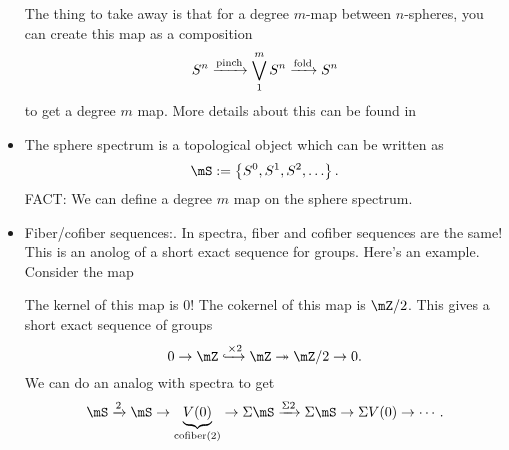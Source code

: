 \begin{itemize}
\begin{center}
    \end{center}
    The thing to take away is that for a degree $m$-map between $n$-spheres, you can create this map as a composition $$S^n\xrightarrow{\text{pinch}}\bigvee_1^m S^n\xrightarrow{\text{fold}}S^n$$ to get a degree $m$ map. More details about this can be found in \cite[\S 2.2]{Hatcher}
    \item The {sphere spectrum} is a topological object which can be written as $$\mS:=\sets{S^0,S^1,S^2,\dots}.$$ FACT: We can define a degree $m$ map on the sphere spectrum. 
    \item Fiber/cofiber sequences:. In spectra, fiber and cofiber sequences are the same! This is an anolog of a short exact sequence for groups. Here's an example. Consider the map 
    \begin{center}
    \end{center}
    The kernel of this map is 0! The cokernel of this map is $\mZ/2$. This gives a short exact sequence of groups $$0\to \mZ\xhookrightarrow{\by 2}\mZ\onto \mZ/2\to 0.$$ We can do an analog with spectra to get $$\mS\xr{2}\mS\to \underbrace{V(0)}_{\text{cofiber}(2)}\to \Sigma \mS\xr{\Sigma 2}\Sigma \mS\to \Sigma V(0)\to \cdots.$$


\end{itemize}
